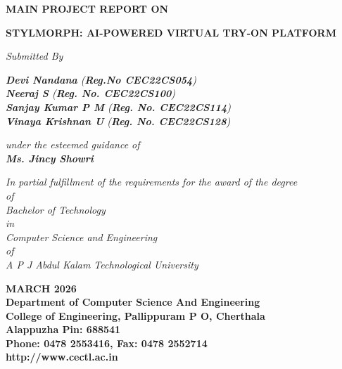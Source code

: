 \documentclass[12pt,a4paper,oneside]{report}
\begin{document}
\begin{titlepage}
\begin{center}
\large\textbf{MAIN PROJECT REPORT ON}\\
\begin{center}
\textbf{\Large{STYLMORPH: AI-POWERED VIRTUAL TRY-ON PLATFORM}}
\end{center}

\large{\textit{Submitted By }}\\
\begin{singlespace}
\large{\textit{\textbf{Devi Nandana}
(\textbf{Reg.No CEC22CS054})}}\\
\large{\textit{\textbf{Neeraj S}
(\textbf{Reg. No. CEC22CS100})}}\\
\large{\textit{\textbf{Sanjay Kumar P M}
(\textbf{Reg. No. CEC22CS114})}}\\
\large{\textit{\textbf{Vinaya Krishnan U}
(\textbf{Reg. No. CEC22CS128})}}\\
\end{singlespace}
\large{\textit{under the esteemed guidance of}}\\
\large{\textit{\textbf{Ms. Jincy Showri}}}\\
\begin{singlespace}
\large{\textit{In partial fulfillment of the requirements for the award of the degree}\\
\large{ \textit{of}}\\
\large{\textit{Bachelor of Technology} }\\
\large{\textit{in}}\\
\large{\textit{Computer Science and Engineering}}\\
\large{\textit{of}}\\
\large{\textit{A P J Abdul Kalam Technological University }}}\\
\end{singlespace}
\begin{figure}[h]
\begin{center}
\end{center}
\end{figure}
\vspace{-.2in}
\begin{singlespace}
\large{\textbf{MARCH 2026\\Department of Computer Science And 
Engineering\\College of Engineering, Pallippuram P O, Cherthala\\ Alappuzha Pin: 688541\\
Phone: 0478 2553416, Fax: 0478 2552714 \\ http://www.cectl.ac.in}}
\end{singlespace}
\end{center}
\end{titlepage}
\end{document}
